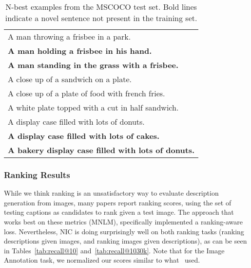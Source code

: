 \begin{table}[htb]
\begin{center}
\begin{tabular}{|l|}\hline
A man throwing a frisbee in a park. \\
{\bf A man holding a frisbee in his hand.} \\
{\bf A man standing in the grass with a frisbee.} \\
\hline
A close up of a sandwich on a plate. \\
A close up of a plate of food with french fries. \\
A white plate topped with a cut in half sandwich. \\
\hline
A display case filled with lots of donuts. \\
{\bf A display case filled with lots of cakes.} \\
{\bf A bakery display case filled with lots of donuts.} \\
\hline
\end{tabular}
\end{center}
\caption{{N-best examples from the MSCOCO test set. Bold lines indicate a novel sentence not present in the training set.}}
\label{tab:diversity}
\end{table}

\subsubsection{Ranking Results}

While we think ranking is an unsatisfactory way to evaluate description
generation from images, many papers report ranking scores,
using the set of testing captions as candidates to rank given a test image.
The approach that works best on these metrics (MNLM),
specifically implemented a ranking-aware loss. Nevertheless,
NIC is doing surprisingly well on both ranking tasks (ranking descriptions
given images, and ranking images given descriptions),
as can be seen in
Tables~\ref{tab:recall@10} and~\ref{tab:recall@1030k}. Note that for the Image Annotation task, we normalized our scores similar to what~\cite{baidu2014} used.


